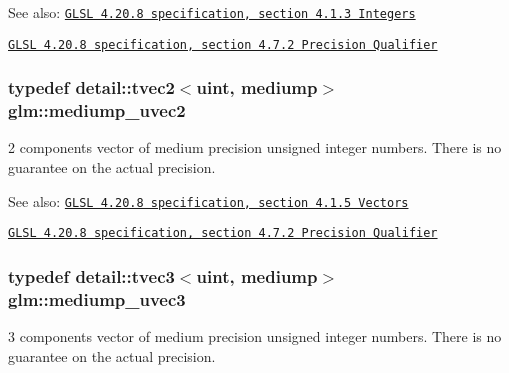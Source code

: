 \begin{Desc}
\item[See also:]\href{http://www.opengl.org/registry/doc/GLSLangSpec.4.20.8.pdf}{\tt GLSL 4.20.8 specification, section 4.1.3 Integers} 

\href{http://www.opengl.org/registry/doc/GLSLangSpec.4.20.8.pdf}{\tt GLSL 4.20.8 specification, section 4.7.2 Precision Qualifier} \end{Desc}
\hypertarget{group__core__precision_g15c8fb77bdb6763ef73b39e02eb98a56}{
\subsubsection[mediump\_\-uvec2]{\setlength{\rightskip}{0pt plus 5cm}typedef detail::tvec2$<$uint, mediump$>$ {\bf glm::mediump\_\-uvec2}}}
\label{group__core__precision_g15c8fb77bdb6763ef73b39e02eb98a56}


2 components vector of medium precision unsigned integer numbers. There is no guarantee on the actual precision.

\begin{Desc}
\item[See also:]\href{http://www.opengl.org/registry/doc/GLSLangSpec.4.20.8.pdf}{\tt GLSL 4.20.8 specification, section 4.1.5 Vectors} 

\href{http://www.opengl.org/registry/doc/GLSLangSpec.4.20.8.pdf}{\tt GLSL 4.20.8 specification, section 4.7.2 Precision Qualifier} \end{Desc}
\hypertarget{group__core__precision_gebdefe98b08421ef645f65c706af46b2}{
\subsubsection[mediump\_\-uvec3]{\setlength{\rightskip}{0pt plus 5cm}typedef detail::tvec3$<$uint, mediump$>$ {\bf glm::mediump\_\-uvec3}}}
\label{group__core__precision_gebdefe98b08421ef645f65c706af46b2}


3 components vector of medium precision unsigned integer numbers. There is no guarantee on the actual precision.

